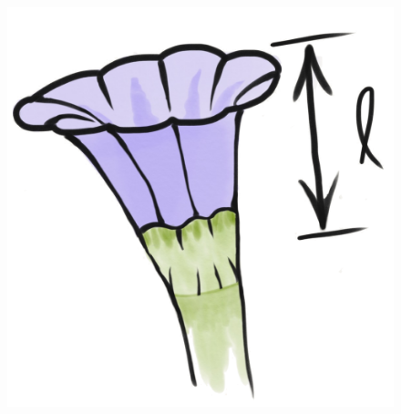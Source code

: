 \begin{figure}

  \centering
  \begin{columns}[T,onlytextwidth]
\column{\textwidth}
\begin{minipage}[]{0.1\textwidth}
\includegraphics[width=\textwidth]{img/hbird_flower}
\end{minipage}%
\begin{minipage}[]{0.45\textwidth}
   \begin{subfigure}[b]{\textwidth}
    \centering
  \includegraphics[width=\textwidth]{img/hbird_lowevol}

\end{subfigure}
\end{minipage}
\end{columns}
\end{figure}
